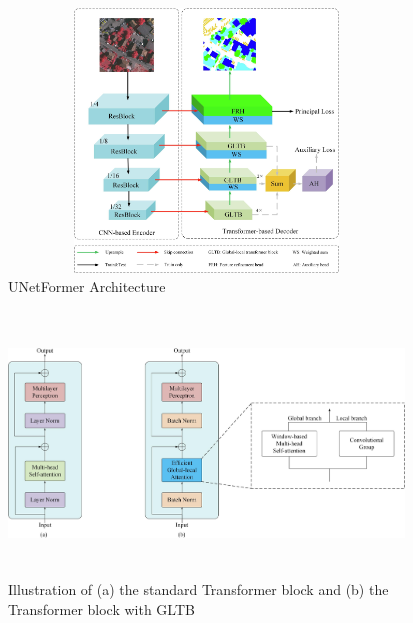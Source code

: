 \FloatBarrier
\begin{figure}[ht]
\centering
\includegraphics[width=10.5cm, height=7cm]{images/unetformer.jpg}
\caption{UNetFormer Architecture \protect\cite{unetformer}}
\label{fig:unetformer}
\end{figure}
\begin{figure}[ht]
\centering
\includegraphics[width=10.5cm, height=7cm]{images/gltb.jpg}
\caption{ Illustration of (a) the standard Transformer block and (b) the Transformer block with GLTB \protect\cite{unetformer}}
\label{fig:gltb}
\end{figure}

